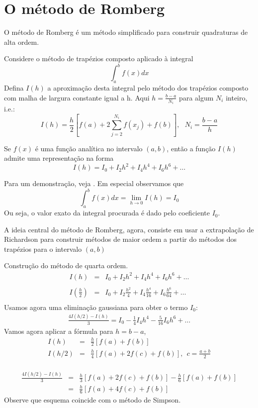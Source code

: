 \section{O método de Romberg}
O método de Romberg é um método simplificado para construir quadraturas de alta ordem.

Considere o método de trapézios composto aplicado à integral
$$\int_a^bf(x)dx$$
Defina $I(h)$ a aproximação desta integral pelo método dos trapézios composto com  malha de largura constante igual a h. Aqui $h=\frac{b-a}{N_i}$ para algum $N_i$ inteiro, i.e.:
$$I(h)=\frac{h}{2}\left[f(a)+2\sum_{j=2}^{N_i} f(x_j)+ f(b)\right],~~~N_i=\frac{b-a}{h}$$

\begin{teo} Se $f(x)$ é uma função analítica no intervalo $(a,b)$, então a função $I(h)$ admite uma representação na forma
$$I(h)=I_0 + I_2 h^2 + I_4{h^4}+ I_6{h^6}+\ldots$$
\end{teo}
Para um demonstração, veja \cite{DEMAILLY}. Em especial observamos que
$$\int_a^b f(x)dx = \lim_{h\to 0}I(h)=I_0$$
Ou seja, o valor exato da integral procurada é dado pelo coeficiente $I_0$.

A ideia central do método de Romberg, agora, consiste em usar a extrapolação de Richardson para construir métodos de maior ordem a partir do métodos dos trapézios para o intervalo $(a,b)$
\begin{ex} \label{exemplo_romberg_1}Construção do método de quarta ordem.
\begin{eqnarray*}
I(h)&=&I_0 + I_2 h^2 + I_4{h^4}+ I_6{h^6}+\ldots\\~\\
I\left(\frac{h}{2}\right)&=&I_0 + I_2 \frac{h^2}{4} + I_4\frac{h^4}{16}+ I_6\frac{h^6}{64}+\ldots\\
\end{eqnarray*}
Usamos agora uma eliminação gaussiana para obter o termo $I_0$:
\begin{eqnarray*}
\frac{4I(h/2)-I(h)}{3}=I_0-\frac{1}{4}I_4h^4-\frac{5}{16}I_6h^6+\ldots
\end{eqnarray*}
Vamos agora aplicar a fórmula para $h=b-a$,
\begin{eqnarray*}
I(h)&=& \frac{h}{2} \left[f(a)+f(b)\right]\\
I(h/2)&=& \frac{h}{4} \left[f(a)+2f\left(c\right)+f(b)\right],~~ c=\frac{a+b}{2}\\
\end{eqnarray*}

\begin{eqnarray*}
\frac{4I(h/2)-I(h)}{3}&=&\frac{h}{3}\left[f(a)+2f\left(c\right)+f(b)\right]-\frac{h}{6} \left[f(a)+f(b)\right]\\
&=&\frac{h}{6}\left[f(a)+4f\left(c\right)+f(b)\right]
\end{eqnarray*}
Observe que esquema coincide com o método de Simpson.
\end{ex}

